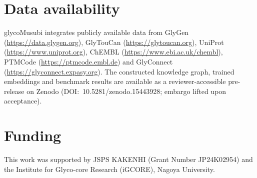 \documentclass[11pt,a4paper]{article}
\begin{document}
\section*{Data availability}

glycoMusubi integrates publicly available data from GlyGen
(\url{https://data.glygen.org}), GlyTouCan (\url{https://glytoucan.org}),
UniProt (\url{https://www.uniprot.org}), ChEMBL
(\url{https://www.ebi.ac.uk/chembl}), PTMCode (\url{https://ptmcode.embl.de})
and GlyConnect (\url{https://glyconnect.expasy.org}). The constructed knowledge graph, trained embeddings and benchmark results are
available as a reviewer-accessible pre-release on Zenodo
(DOI:~10.5281/zenodo.15443928; embargo lifted upon acceptance).

\section*{Funding}

This work was supported by JSPS KAKENHI (Grant Number JP24K02954) and the
Institute for Glyco-core Research (iGCORE), Nagoya University.






\end{document}
